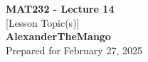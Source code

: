 \begin{titlepage}
    \null %
    \vfill
    \begin{center}
        {\fontsize{40}{48}\selectfont \bfseries MAT232 - Lecture 14}
        \vspace{20pt} \\
        {\LARGE [Lesson Topic(s)]} \\
        \vspace{20pt}
        \textbf{AlexanderTheMango}
        \vspace{8pt}
        \\ Prepared for February 27, 2025
    \end{center}
    \vfill
\end{titlepage}
